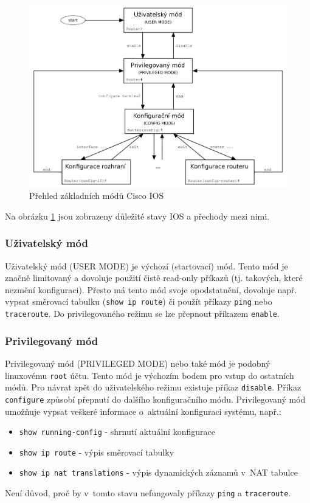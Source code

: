\begin{figure}[h]
\begin{center}
\includegraphics[width=13cm]{figures/ios.png}
\caption{Přehled základních módů Cisco IOS \cite{wiki:ios}}
\label{fig:ios}
\end{center}
\end{figure}

Na obrázku \ref{fig:ios} jsou zobrazeny důležité stavy IOS a přechody mezi nimi. 


\subsubsection{Uživatelský mód}
Uživatelský mód (USER MODE) je výchozí (startovací) mód. Tento mód je značně limitovaný a dovoluje použití čistě read-only příkazů (tj. takových, které nezmění konfiguraci). Přesto má tento mód svoje opodstatnění, dovoluje např. vypsat směrovací tabulku (\verb|show ip route|) či použít příkazy \verb|ping| nebo \verb|traceroute|. Do privilegovaného režimu se lze přepnout příkazem \verb|enable|.

\subsubsection{Privilegovaný mód}
Privilegovaný mód (PRIVILEGED MODE) nebo také  mód je podobný linuxovému \verb|root| účtu. Tento mód je výchozím bodem pro vstup do ostatních módů. Pro návrat zpět do uživatelského režimu existuje příkaz \verb|disable|. Příkaz \verb|configure| způsobí přepnutí do dalšího konfiguračního módu. Privilegovaný mód umožňuje vypsat veškeré informace o~aktuální konfiguraci systému, např.:
\begin{itemize}
 \item \verb|show running-config| - shrnutí aktuální konfigurace
 \item \verb|show ip route| - výpis směrovací tabulky
 \item \verb|show ip nat translations| - výpis dynamických záznamů v~NAT tabulce
\end{itemize}
Není důvod, proč by v~tomto stavu nefungovaly příkazy \verb|ping| a \verb|traceroute|.


